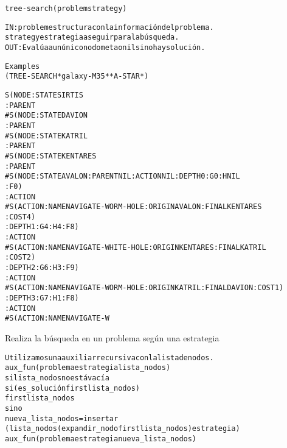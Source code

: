 \begin{aibox}{\function}
\begin{alltt}
tree-search (problem strategy)


   IN: problem     estructura con la información del problema.
       strategy     estrategia a seguir para la búsqueda.
   OUT: Evalúa a un único nodo meta o nil si no hay solución.

\end{alltt}
\end{aibox}

\begin{aibox}{\examples}
\begin{alltt}
Examples
(TREE-SEARCH *galaxy-M35* *A-STAR*)

S(NODE :STATE SIRTIS
  :PARENT
  \#S(NODE :STATE DAVION
     :PARENT
     \#S(NODE :STATE KATRIL
        :PARENT
        \#S(NODE :STATE KENTARES
           :PARENT
           \#S(NODE :STATE AVALON :PARENT NIL :ACTION NIL :DEPTH 0 :G 0 :H NIL
              :F 0)
           :ACTION
           \#S(ACTION :NAME NAVIGATE-WORM-HOLE :ORIGIN AVALON :FINAL KENTARES
              :COST 4)
           :DEPTH 1 :G 4 :H 4 :F 8)
        :ACTION
        \#S(ACTION :NAME NAVIGATE-WHITE-HOLE :ORIGIN KENTARES :FINAL KATRIL
           :COST 2)
        :DEPTH 2 :G 6 :H 3 :F 9)
     :ACTION
     \#S(ACTION :NAME NAVIGATE-WORM-HOLE :ORIGIN KATRIL :FINAL DAVION :COST 1)
     :DEPTH 3 :G 7 :H 1 :F 8)
  :ACTION
  \#S(ACTION :NAME NAVIGATE-W


\end{alltt}
\end{aibox}

\begin{aibox}{\comments}
Realiza la búsqueda en un problema según una estrategia

\end{aibox}

\newpage
\begin{aibox}{\pseudocode}
\begin{alltt}
   Utilizamos una auxiliar recursiva con la lista de nodos.
   aux\_fun(problema estrategia lista\_nodos)
       si lista\_nodos no está vacía
           si ( es\_solución first lista\_nodos)
               first lista\_nodos
           sino
               nueva\_lista\_nodos = insertar
                         (lista\_nodos (expandir\_nodo first lista\_nodos) estrategia)
               aux\_fun (problema estrategia nueva\_lista\_nodos)
   

\end{alltt}
\end{aibox}

